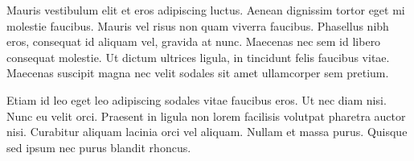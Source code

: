 \documentclass[a4paper, 12pt]{article}
\begin{document}
Mauris vestibulum elit et eros adipiscing luctus. Aenean dignissim
tortor eget mi molestie faucibus. Mauris vel risus non quam viverra
faucibus. Phasellus nibh eros, consequat id aliquam vel, gravida at
nunc. Maecenas nec sem id libero consequat molestie. Ut dictum
ultrices ligula, in tincidunt felis faucibus vitae. Maecenas suscipit
magna nec velit sodales sit amet ullamcorper sem pretium.

Etiam id leo eget leo adipiscing sodales vitae faucibus eros. Ut nec
diam nisi. Nunc eu velit orci. Praesent in ligula non lorem facilisis
volutpat pharetra auctor nisi. Curabitur aliquam lacinia orci vel
aliquam. Nullam et massa purus. Quisque sed ipsum nec purus blandit
rhoncus.
\end{document}
